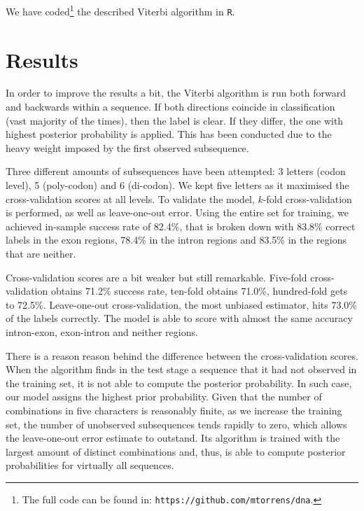 \documentclass[a4paper, 11pt]{article} %
\begin{document}
We have coded\footnote{The full code can be found in: \texttt{https://github.com/mtorrens/dna}.} the described Viterbi algorithm in \texttt{R}. 

\section*{Results}

In order to improve the results a bit, the Viterbi algorithm is run both forward and backwards within a sequence. If both directions coincide in classification (vast majority of the times), then the label is clear. If they differ, the one with highest posterior probability is applied. This has been conducted due to the heavy weight imposed by the first observed subsequence.

Three different amounts of subsequences have been attempted: 3 letters (codon level), 5 (poly-codon) and 6 (di-codon). We kept five letters as it maximised the cross-validation scores at all levels. To validate the model, $k$-fold cross-validation is performed, as well as leave-one-out error. Using the entire set for training, we achieved in-sample success rate of 82.4\%, that is broken down with 83.8\% correct labels in the exon regions, 78.4\% in the intron regions and 83.5\% in the regions that are neither.

Cross-validation scores are a bit weaker but still remarkable. Five-fold cross-validation obtains 71.2\% success rate, ten-fold obtains 71.0\%, hundred-fold gets to 72.5\%. Leave-one-out cross-validation, the most unbiased estimator, hits 73.0\% of the labels correctly. The model is able to score with almost the same accuracy intron-exon, exon-intron and neither regions.

There is a reason reason behind the difference between the cross-validation scores. When the algorithm finds in the test stage a sequence that it had not observed in the training set, it is not able to compute the posterior probability. In such case, our model assigns the highest prior probability. Given that the number of combinations in five characters is reasonably finite, as we increase the training set, the number of unobserved subsequences tends rapidly to zero, which allows the leave-one-out error estimate to outstand. Its algorithm is trained with the largest amount of distinct combinations and, thus, is able to compute posterior probabilities for virtually all sequences.

\end{document}
